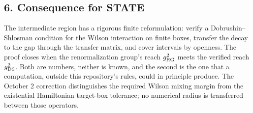 \documentclass[11pt,a4paper]{article}
\begin{document}
\subsection{6. Consequence for STATE}\label{consequence-for-state}

The intermediate region has a rigorous finite reformulation: verify a
Dobrushin--Shlosman condition for the Wilson interaction on finite
boxes, transfer the decay to the gap through the transfer matrix, and
cover intervals by openness. The proof closes when the renormalization
group's reach \(g_{\rm RG}^2\) meets the verified reach
\(g_{\rm DS}^2\). Both are numbers, neither is known, and the second is
the one that a computation, outside this repository's rules, could in
principle produce. The October 2 correction distinguishes the required
Wilson mixing margin from the existential Hamiltonian target-box
tolerance; no numerical radius is transferred between those operators.
\end{document}
